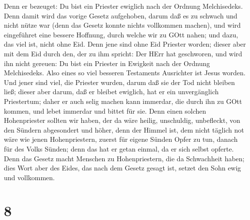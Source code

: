  Denn er bezeuget: Du bist ein Priester ewiglich nach der
Ordnung Melchisedeks.  Denn damit wird das vorige Gesetz
aufgehoben, darum daß es zu schwach und nicht nütze war 
(denn das Gesetz konnte nichts vollkommen machen), und wird eingeführet
eine bessere Hoffnung, durch welche wir zu GOtt nahen;  und
dazu, das viel ist, nicht ohne Eid. Denn jene sind ohne Eid Priester
worden;  dieser aber mit dem Eid durch den, der zu ihm
spricht: Der HErr hat geschworen, und wird ihn nicht gereuen: Du bist
ein Priester in Ewigkeit nach der Ordnung Melchisedeks. 
Also eines so viel besseren Testaments Ausrichter ist Jesus worden.
 Und jener sind viel, die Priester wurden, darum daß sie
der Tod nicht bleiben ließ;  dieser aber darum, daß er
bleibet ewiglich, hat er ein unvergänglich Priestertum; 
daher er auch selig machen kann immerdar, die durch ihn zu GOtt kommen,
und lebet immerdar und bittet für sie.  Denn einen solchen
Hohenpriester sollten wir haben, der da wäre heilig, unschuldig,
unbefleckt, von den Sündern abgesondert und höher, denn der Himmel ist,
 dem nicht täglich not wäre wie jenen Hohenpriestern,
zuerst für eigene Sünden Opfer zu tun, danach für des Volks Sünden; denn
das hat er getan einmal, da er sich selbst opferte.  Denn
das Gesetz macht Menschen zu Hohenpriestern, die da Schwachheit haben;
dies Wort aber des Eides, das nach dem Gesetz gesagt ist, setzet den
Sohn ewig und vollkommen.

\hypertarget{section-6}{%
\section{8}\label{section-6}}

